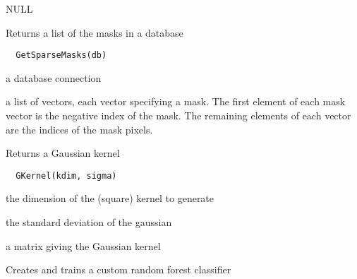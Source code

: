 \documentclass[a4paper]{book}
\begin{document}
%
\begin{Value}
NULL
\end{Value}
%
\begin{Description}\relax
Returns a list of the masks in a database
\end{Description}
%
\begin{Usage}
\begin{verbatim}
  GetSparseMasks(db)
\end{verbatim}
\end{Usage}
%
\begin{Arguments}
\begin{ldescription}
\item[\code{db}] a database connection
\end{ldescription}
\end{Arguments}
%
\begin{Value}
a list of vectors, each vector specifying a mask.  The
first element of each mask vector is the negative index
of the mask.  The remaining elements of each vector are
the indices of the mask pixels.
\end{Value}
%
\begin{Description}\relax
Returns a Gaussian kernel
\end{Description}
%
\begin{Usage}
\begin{verbatim}
  GKernel(kdim, sigma)
\end{verbatim}
\end{Usage}
%
\begin{Arguments}
\begin{ldescription}
\item[\code{kdim}] the dimension of the (square) kernel to
generate

\item[\code{sigma}] the standard deviation of the gaussian
\end{ldescription}
\end{Arguments}
%
\begin{Value}
a matrix giving the Gaussian kernel
\end{Value}
%
\begin{Description}\relax
Creates and trains a custom random forest classifier
\end{Description}
\end{document}
